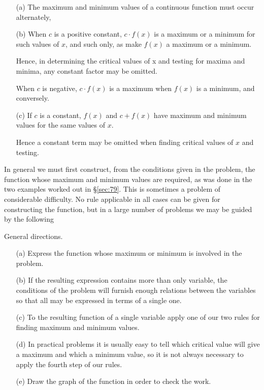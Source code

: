 \begin{itemize}
\item[(a)] 
The maximum and minimum values of a continuous function must occur alternately,

\item[(b)] 
When $c$ is a positive constant, $c \cdot f(x)$ is a maximum 
or a minimum for such values of $x$, and such only, as make $f(x)$ 
a maximum or a minimum.

Hence, in determining the critical values of x and testing for maxima and 
minima, any constant factor may be omitted.

When $c$ is negative, $c \cdot f(x)$ is a maximum when $f(x)$ is 
a minimum, and conversely.

\item[(c)] 
If $c$ is a constant, $f(x)$ and $c + f(x)$
have maximum and minimum values for the same values of $x$.

Hence a constant term may be omitted when finding critical values of 
$x$ and testing.
\end{itemize}

In general we must first construct, from the conditions given in 
the problem, the function whose maximum and minimum values are 
required, as was done in the two examples worked out 
in \S \ref{sec:79}. %
This is sometimes a problem of considerable difficulty. No rule 
applicable in all cases can be given for constructing the 
function, but in a large number of problems we may be guided by the following

General directions.

\begin{itemize}
\item[(a)] 
Express the function whose maximum or minimum is involved in the problem.

\item[(b)] 
If the resulting expression contains more than only variable, 
the conditions of the problem will furnish enough relations 
between the variables so that all may be expressed in terms of a single one.

\item[(c)] 
To the resulting function of a single variable apply one of 
our two rules for finding maximum and minimum values.

\item[(d)] 
In practical problems it is usually easy to tell which 
critical value will give a maximum and which a minimum value, 
so it is not always necessary to apply the fourth step of our rules.

\item[(e)] 
Draw the graph of the function in order to check the work.

\end{itemize}

